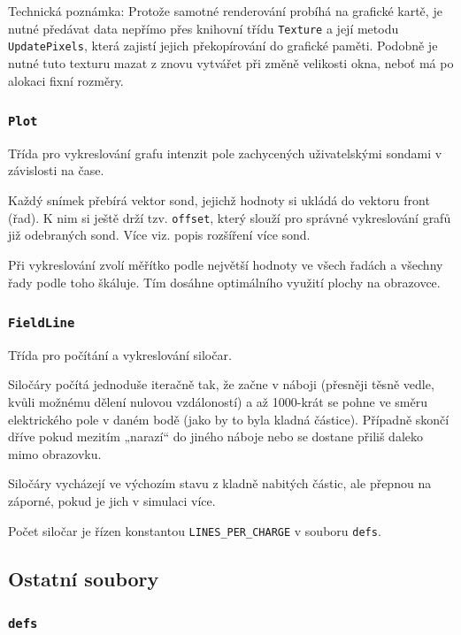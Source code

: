 \documentclass[12pt,a4paper]{article}
\newcommand{\code}[1]{\texttt{#1}}
\begin{document}
Technická poznámka: Protože samotné renderování probíhá na grafické kartě, je
nutné předávat data nepřímo přes knihovní třídu \code{Texture} a její metodu
\code{UpdatePixels}, která zajistí jejich překopírování do grafické paměti.
Podobně je nutné tuto texturu mazat z znovu vytvářet při změně velikosti okna,
neboť má po alokaci fixní rozměry.

\subsubsection{\code{Plot}}
\label{sec:plot}

Třída pro vykreslování grafu intenzit pole zachycených uživatelskými sondami v
závislosti na čase. 

Každý snímek přebírá vektor sond, jejichž hodnoty si ukládá do vektoru front
(řad). K nim si ještě drží tzv. \code{offset}, který slouží pro správné
vykreslování grafů již odebraných sond. Více viz. popis rozšíření více sond.

Při vykreslování zvolí měřítko podle největší hodnoty ve všech řadách a všechny
řady podle toho škáluje. Tím dosáhne optimálního využití plochy na obrazovce.

\subsubsection{\code{FieldLine}}
\label{sec:fieldline}

Třída pro počítání a vykreslování siločar.

Siločáry počítá jednoduše iteračně tak, že začne v náboji (přesněji těsně vedle,
kvůli možnému dělení nulovou vzdáloností) a až 1000-krát se pohne ve směru
elektrického pole v daném bodě (jako by to byla kladná částice). Případně skončí
dříve pokud mezitím „narazí“ do jiného náboje nebo se dostane přiliš daleko mimo
obrazovku.

Siločáry vycházejí ve výchozím stavu z kladně nabitých částic, ale přepnou na
záporné, pokud je jich v simulaci více.

Počet siločar je řízen konstantou \code{LINES\_PER\_CHARGE} v souboru \code{defs}.

\subsection{Ostatní soubory}

\subsubsection{\code{defs}}
\end{document}
